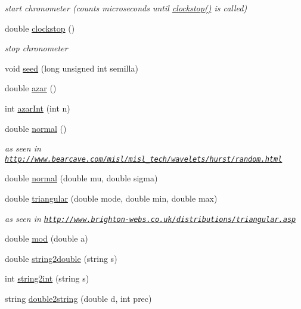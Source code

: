 \begin{DoxyCompactItemize}
\begin{DoxyCompactList}\small\item\em start chronometer (counts microseconds until \hyperlink{classtoolbox_a8fe27f13cb254a568c8ec0295e5a734f}{clockstop()} is called) \end{DoxyCompactList}\item 
double \hyperlink{classtoolbox_a8fe27f13cb254a568c8ec0295e5a734f}{clockstop} ()
\begin{DoxyCompactList}\small\item\em stop chronometer \end{DoxyCompactList}\item 
void \hyperlink{classtoolbox_a4ea98edf9956998c061850754a37281d}{seed} (long unsigned int semilla)
\item 
double \hyperlink{classtoolbox_a7b24111985e7dcac53f092e954e0cc07}{azar} ()
\item 
int \hyperlink{classtoolbox_ada9e591755dfbbf32979bc1d3f2f81c6}{azar\+Int} (int n)
\item 
double \hyperlink{classtoolbox_a67450c1434f5b2f278c37b6f78f6c91d}{normal} ()
\begin{DoxyCompactList}\small\item\em as seen in \href{http://www.bearcave.com/misl/misl_tech/wavelets/hurst/random.html}{\tt http\+://www.\+bearcave.\+com/misl/misl\+\_\+tech/wavelets/hurst/random.\+html} \end{DoxyCompactList}\item 
double \hyperlink{classtoolbox_a30631661b56eb3e11b40c118241ba6f6}{normal} (double mu, double sigma)
\item 
double \hyperlink{classtoolbox_a76420d97756e45135baa61e037e03d20}{triangular} (double mode, double min, double max)
\begin{DoxyCompactList}\small\item\em as seen in \href{http://www.brighton-webs.co.uk/distributions/triangular.asp}{\tt http\+://www.\+brighton-\/webs.\+co.\+uk/distributions/triangular.\+asp} \end{DoxyCompactList}\item 
double \hyperlink{classtoolbox_a0daf970243cd9158552300762de3f801}{mod} (double a)
\item 
double \hyperlink{classtoolbox_a1347524ce4a6b1db516421f1c2905e44}{string2double} (string s)
\item 
int \hyperlink{classtoolbox_a86769fb57c8a0b58b14a9946a0c90043}{string2int} (string s)
\item 
string \hyperlink{classtoolbox_afb97b8bab923a8c293ff5aa944ed64f7}{double2string} (double d, int prec)

\end{DoxyCompactItemize}

